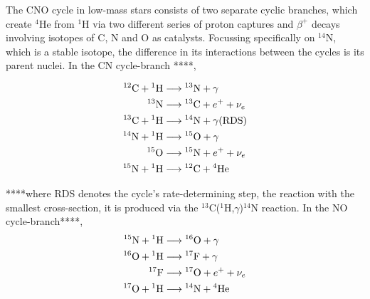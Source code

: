 \documentclass[12pt, a4paper]{report}
\begin{document}
The CNO cycle in low-mass stars consists of two separate cyclic branches, which create $^{4}$He from $^{1}$H via two different series of proton captures and $\beta ^{+}$ decays involving isotopes of C, N and O as catalysts. Focussing specifically on $^{14}$N, which is a stable isotope, the difference in its interactions between the cycles is its parent nuclei. In the CN cycle-branch \citep{2005essp.book.....S}****,



\begin{align}
\begin{split}
{}^{12}\textnormal{C} + {}^{1}\textnormal{H} & \longrightarrow {}^{13}\textnormal{N} + \gamma \\
{}^{13}\textnormal{N} & \longrightarrow {}^{13}\textnormal{C} + e^{+} + \nu_{e} \\
{}^{13}\textnormal{C} + {}^{1}\textnormal{H} & \longrightarrow {}^{14}\textnormal{N} + \gamma \textnormal{(RDS)} \\
{}^{14}\textnormal{N} + {}^{1}\textnormal{H} & \longrightarrow {}^{15}\textnormal{O} + \gamma \quad \\
{}^{15}\textnormal{O} & \longrightarrow {}^{15}\textnormal{N} + e^{+} + \nu_{e} \\
{}^{15}\textnormal{N} + {}^{1}\textnormal{H} & \longrightarrow {}^{12}\textnormal{C} + {}^{4}\textnormal{He}
\end{split}
\end{align}




****where RDS denotes the cycle's rate-determining step, the reaction with the smallest cross-section, it is produced via the $^{13}$C($^{1}$H,$\gamma$)$^{14}$N reaction. In the NO cycle-branch****,
\begin{align}
\begin{split}
{}^{15}\textnormal{N} + {}^{1}\textnormal{H} & \longrightarrow {}^{16}\textnormal{O} + \gamma \\
{}^{16}\textnormal{O} + {}^{1}\textnormal{H} & \longrightarrow {}^{17}\textnormal{F} + \gamma \\
{}^{17}\textnormal{F} & \longrightarrow {}^{17}\textnormal{O} + e^{+} + \nu_{e} \\
{}^{17}\textnormal{O} + {}^{1}\textnormal{H} & \longrightarrow {}^{14}\textnormal{N} + {}^{4}\textnormal{He}
\end{split}
\end{align}
\end{document}
